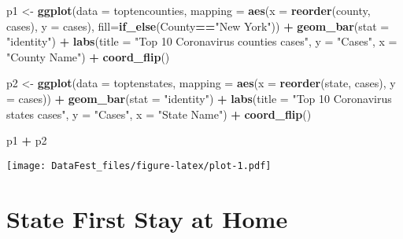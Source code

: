 \documentclass[
]{article}
\newenvironment{Shaded}{\begin{snugshade}}{\end{snugshade}}
\newcommand{\DataTypeTok}[1]{\textcolor[rgb]{0.13,0.29,0.53}{#1}}
\newcommand{\KeywordTok}[1]{\textcolor[rgb]{0.13,0.29,0.53}{\textbf{#1}}}
\newcommand{\NormalTok}[1]{#1}
\newcommand{\OperatorTok}[1]{\textcolor[rgb]{0.81,0.36,0.00}{\textbf{#1}}}
\newcommand{\StringTok}[1]{\textcolor[rgb]{0.31,0.60,0.02}{#1}}
\begin{document}
\begin{Shaded}
\begin{Highlighting}[]
\NormalTok{p1 <-}\StringTok{ }\KeywordTok{ggplot}\NormalTok{(}\DataTypeTok{data =}\NormalTok{ toptencounties, }\DataTypeTok{mapping =} \KeywordTok{aes}\NormalTok{(}\DataTypeTok{x =} \KeywordTok{reorder}\NormalTok{(county, cases), }\DataTypeTok{y =}\NormalTok{ cases), }\DataTypeTok{fill=}\KeywordTok{if_else}\NormalTok{(County}\OperatorTok{==}\StringTok{"New York"}\NormalTok{)) }\OperatorTok{+}
\StringTok{  }\KeywordTok{geom_bar}\NormalTok{(}\DataTypeTok{stat =} \StringTok{"identity"}\NormalTok{) }\OperatorTok{+}\StringTok{ }
\StringTok{  }\KeywordTok{labs}\NormalTok{(}\DataTypeTok{title =} \StringTok{"Top 10 Coronavirus counties cases"}\NormalTok{, }
       \DataTypeTok{y =} \StringTok{"Cases"}\NormalTok{, }\DataTypeTok{x =} \StringTok{"County Name"}\NormalTok{) }\OperatorTok{+}\StringTok{ }
\StringTok{  }\KeywordTok{coord_flip}\NormalTok{()}

\NormalTok{p2 <-}\StringTok{ }\KeywordTok{ggplot}\NormalTok{(}\DataTypeTok{data =}\NormalTok{ toptenstates, }\DataTypeTok{mapping =} \KeywordTok{aes}\NormalTok{(}\DataTypeTok{x =} \KeywordTok{reorder}\NormalTok{(state, cases), }\DataTypeTok{y =}\NormalTok{ cases)) }\OperatorTok{+}
\StringTok{  }\KeywordTok{geom_bar}\NormalTok{(}\DataTypeTok{stat =} \StringTok{"identity"}\NormalTok{) }\OperatorTok{+}\StringTok{ }
\StringTok{  }\KeywordTok{labs}\NormalTok{(}\DataTypeTok{title =} \StringTok{"Top 10 Coronavirus states cases"}\NormalTok{, }
       \DataTypeTok{y =} \StringTok{"Cases"}\NormalTok{, }\DataTypeTok{x =} \StringTok{"State Name"}\NormalTok{) }\OperatorTok{+}\StringTok{ }
\StringTok{  }\KeywordTok{coord_flip}\NormalTok{() }

\NormalTok{p1 }\OperatorTok{+}\StringTok{ }\NormalTok{p2}
\end{Highlighting}
\end{Shaded}

\texttt{[image: DataFest\_files/figure-latex/plot-1.pdf]}

\hypertarget{state-first-stay-at-home}{%
\section{State First Stay at Home}\label{state-first-stay-at-home}}
\end{document}
